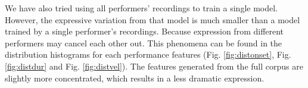 
We have also tried using all performers' recordings to train a single model. However, the expressive variation from that model is much smaller than a model trained by a single performer's recordings. Because expression from different performers may cancel each other out. This phenomena can be found in the distribution histograms for each performance features (Fig. \ref{fig:distonset}, Fig. \ref{fig:distdur} and Fig. \ref{fig:distvel}). The features generated from the full corpus are slightly more concentrated, which results in a less dramatic expression.


